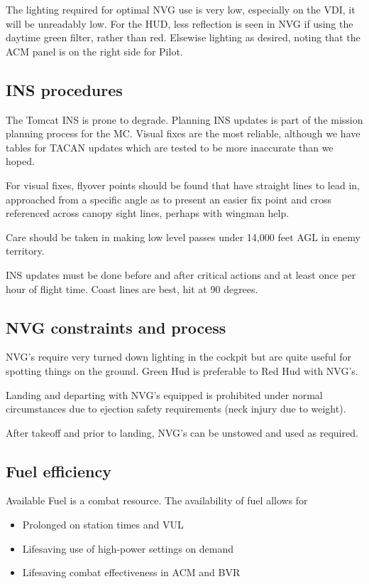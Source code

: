 The lighting required for optimal NVG use is very low, especially on the VDI,
it will be unreadably low. For the HUD, less reflection is seen in NVG if using
the daytime green filter, rather than red. Elsewise lighting as desired, noting
that the ACM panel is on the right side for Pilot.


\subsection{INS procedures}

The Tomcat INS is prone to degrade. Planning INS updates is part of the mission
planning process for the MC. Visual fixes are the most reliable, although we
have tables for TACAN updates which are tested to be more inaccurate than we
hoped.

For visual fixes, flyover points should be found that have straight lines to
lead in, approached from a specific angle as to present an easier fix point and
cross referenced across canopy sight lines, perhaps with wingman help.

Care should be taken in making low level passes under 14,000 feet AGL in enemy
territory.

INS updates must be done before and after critical actions and at least once
per hour of flight time. Coast lines are best, hit at 90 degrees.

\subsection{NVG constraints and process}

NVG's require very turned down lighting in the cockpit but are quite useful for
spotting things on the ground. Green Hud is preferable to Red Hud with NVG's.

Landing and departing with NVG's equipped is prohibited under normal
circumstances due to ejection safety requirements (neck injury due to weight).

After takeoff and prior to landing, NVG's can be unstowed and used as required.

\subsection{Fuel efficiency}

  Available Fuel is a combat resource. The availability of fuel allows for

  \begin{itemize}

    \item Prolonged on station times and VUL

    \item Lifesaving use of high-power settings on demand

    \item Lifesaving combat effectiveness in ACM and BVR

  \end{itemize}

